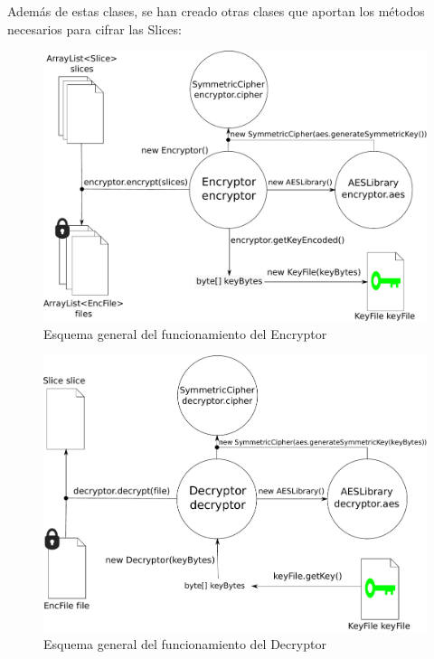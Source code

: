 Además de estas clases, se han creado otras clases que aportan los métodos
necesarios para cifrar las Slices:

\begin{figure}[ht]
  \centering
  \includegraphics[scale=0.5]{Figures/Encryptor}
  \decoRule
  \caption[Encryptor]{Esquema general del funcionamiento del Encryptor}
  \label{fig:Encryptor}
\end{figure}

\begin{figure}[ht]
  \centering
  \includegraphics[scale=0.5]{Figures/Decryptor}
  \decoRule
  \caption[Decryptor]{Esquema general del funcionamiento del Decryptor}
  \label{fig:Decryptor}
\end{figure}

